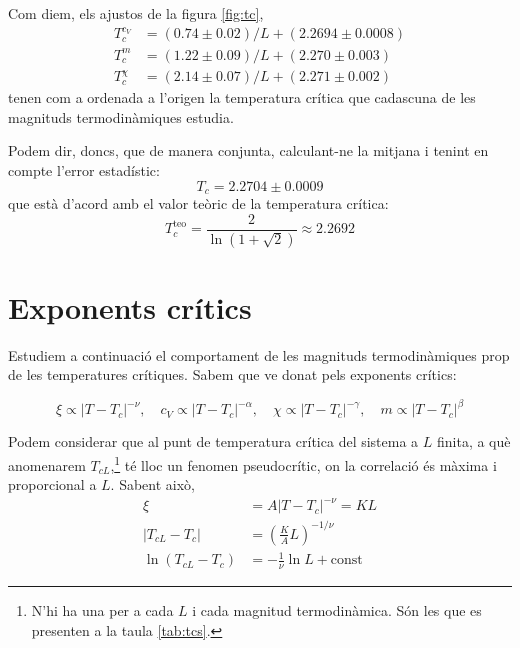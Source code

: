 \documentclass[a4paper]{article}
\begin{document}
Com diem, els ajustos de la figura \ref{fig:tc},
\begin{align*}
    T_c^{c_V} &= (0.74 \pm 0.02)/L + (2.2694 \pm 0.0008) \\
    T_c^{m} &= (1.22 \pm 0.09)/L + (2.270 \pm 0.003) \\
    T_c^{\chi} &= (2.14 \pm 0.07)/L + (2.271 \pm 0.002)
\end{align*}
tenen com a ordenada a l'origen la temperatura crítica que cadascuna de les magnituds termodinàmiques estudia.

Podem dir, doncs, que de manera conjunta, calculant-ne la mitjana i tenint en compte l'error estadístic:
\begin{equation} \label{t-mean}
    T_c = 2.2704 \pm 0.0009
\end{equation}
que està d'acord amb el valor teòric de la temperatura crítica:
\begin{equation*} \label{t-teo}
    T_c^\text{teo} = \frac{2}{\ln(1+\sqrt{2})} \approx 2.2692
\end{equation*}

\section{Exponents crítics}

Estudiem a continuació el comportament de les magnituds termodinàmiques prop de les temperatures crítiques. Sabem que ve donat pels exponents crítics:

\begin{equation*}
    \xi \propto \left| T-T_c \right|^{-\nu},\quad
    c_V \propto \left| T-T_c \right|^{-\alpha},\quad
    \chi \propto \left| T-T_c \right|^{-\gamma},\quad
    m \propto \left| T-T_c \right|^{\beta}
\end{equation*}

Podem considerar que al punt de temperatura crítica del sistema a $L$ finita, a què anomenarem $T_{cL}$,\footnote{N'hi ha una per a cada $L$ i cada magnitud termodinàmica. Són les que es presenten a la taula \ref{tab:tcs}.} té lloc un fenomen pseudocrític, on la correlació és màxima i proporcional a $L$. Sabent això,
\begin{align*}
    \xi &= A \left| T-T_c \right|^{-\nu} = KL \\
    \left|T_{cL}-T_c \right| &= \left(\frac{K}{A} L \right)^{-1/\nu} \\
    \ln \left(T_{cL} - T_c \right) &= -\frac{1}{\nu} \ln L + \text{const}
\end{align*}
\end{document}

